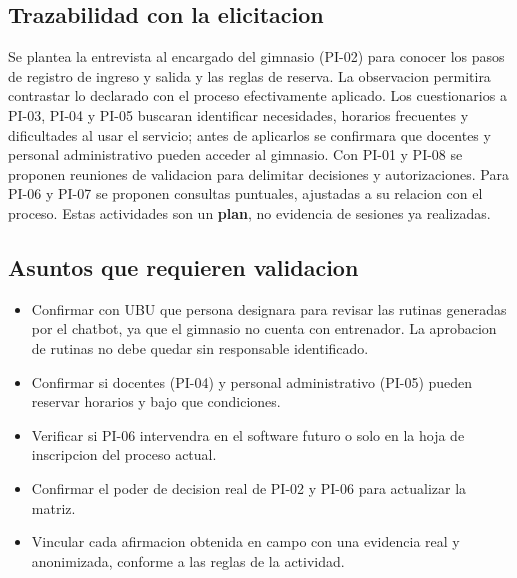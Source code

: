 \subsection{Trazabilidad con la elicitacion}
Se plantea la entrevista al encargado del gimnasio (PI-02) para conocer los pasos de registro de ingreso y salida y las reglas de reserva. La observacion permitira contrastar lo declarado con el proceso efectivamente aplicado. Los cuestionarios a PI-03, PI-04 y PI-05 buscaran identificar necesidades, horarios frecuentes y dificultades al usar el servicio; antes de aplicarlos se confirmara que docentes y personal administrativo pueden acceder al gimnasio. Con PI-01 y PI-08 se proponen reuniones de validacion para delimitar decisiones y autorizaciones. Para PI-06 y PI-07 se proponen consultas puntuales, ajustadas a su relacion con el proceso. Estas actividades son un \textbf{plan}, no evidencia de sesiones ya realizadas.

\subsection{Asuntos que requieren validacion}
\begin{itemize}
  \item Confirmar con UBU que persona designara para revisar las rutinas generadas por el chatbot, ya que el gimnasio no cuenta con entrenador. La aprobacion de rutinas no debe quedar sin responsable identificado.
  \item Confirmar si docentes (PI-04) y personal administrativo (PI-05) pueden reservar horarios y bajo que condiciones.
  \item Verificar si PI-06 intervendra en el software futuro o solo en la hoja de inscripcion del proceso actual.
  \item Confirmar el poder de decision real de PI-02 y PI-06 para actualizar la matriz.
  \item Vincular cada afirmacion obtenida en campo con una evidencia real y anonimizada, conforme a las reglas de la actividad.
\end{itemize}

